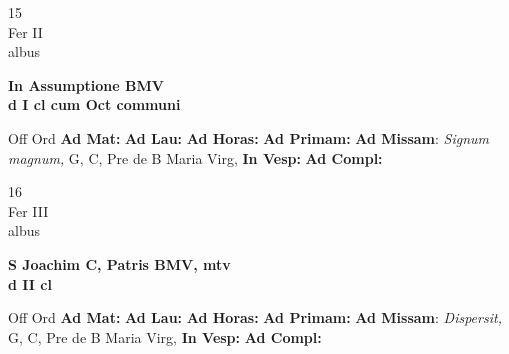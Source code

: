 \documentclass[10pt, openany]{book}
\begin{document}
        \begin{center}
            \begin{minipage}{3.5in}
                \vspace{2em}
                \begin{minipage}{0.5in}
                    {\Huge 15} \\
                    {\normalsize Fer II} \\
                    {\normalsize albus}
                \end{minipage}
                \begin{minipage}{3.0in}
                    \textbf{ \large In Assumptione BMV \\
                    \textnormal{\normalsize d I cl cum Oct communi}} \\ 
                \end{minipage}
                \begin{justify}Off Ord
                    \textbf{Ad Mat: }
                    \textbf{Ad Lau: }
                    \textbf{Ad Horas: }
                    \textbf{Ad Primam: }\textbf{Ad Missam}: \textit{Signum magnum,} G, C, Pre de B Maria Virg,  
                    \textbf{In Vesp: }
                    \textbf{Ad Compl: }
                \end{justify}
            \end{minipage}
        \end{center}
    
        \begin{center}
            \begin{minipage}{3.5in}
                \vspace{2em}
                \begin{minipage}{0.5in}
                    {\Huge 16} \\
                    {\normalsize Fer III} \\
                    {\normalsize albus}
                \end{minipage}
                \begin{minipage}{3.0in}
                    \textbf{ \large S Joachim C, Patris BMV, mtv \\
                    \textnormal{\normalsize d II cl}} \\ 
                \end{minipage}
                \begin{justify}Off Ord
                    \textbf{Ad Mat: }
                    \textbf{Ad Lau: }
                    \textbf{Ad Horas: }
                    \textbf{Ad Primam: }\textbf{Ad Missam}: \textit{Dispersit,} G, C, Pre de B Maria Virg,  
                    \textbf{In Vesp: }
                    \textbf{Ad Compl: }
                \end{justify}
            \end{minipage}
        \end{center}
    
\end{document}
